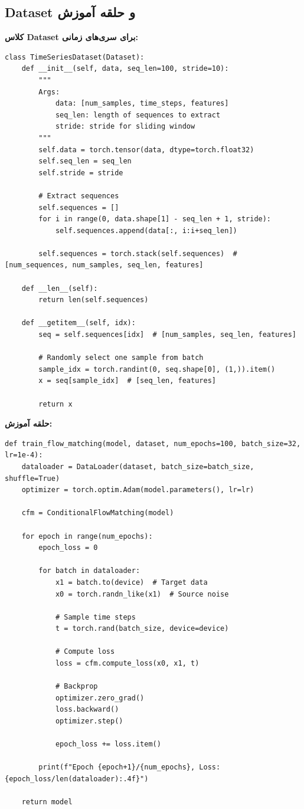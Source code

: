 \subsection{Dataset و حلقه آموزش}

\textbf{کلاس Dataset برای سری‌های زمانی:}
\begin{verbatim}
class TimeSeriesDataset(Dataset):
    def __init__(self, data, seq_len=100, stride=10):
        """
        Args:
            data: [num_samples, time_steps, features]
            seq_len: length of sequences to extract
            stride: stride for sliding window
        """
        self.data = torch.tensor(data, dtype=torch.float32)
        self.seq_len = seq_len
        self.stride = stride
        
        # Extract sequences
        self.sequences = []
        for i in range(0, data.shape[1] - seq_len + 1, stride):
            self.sequences.append(data[:, i:i+seq_len])
        
        self.sequences = torch.stack(self.sequences)  # [num_sequences, num_samples, seq_len, features]
    
    def __len__(self):
        return len(self.sequences)
    
    def __getitem__(self, idx):
        seq = self.sequences[idx]  # [num_samples, seq_len, features]
        
        # Randomly select one sample from batch
        sample_idx = torch.randint(0, seq.shape[0], (1,)).item()
        x = seq[sample_idx]  # [seq_len, features]
        
        return x
\end{verbatim}

\textbf{حلقه آموزش:}
\begin{verbatim}
def train_flow_matching(model, dataset, num_epochs=100, batch_size=32, lr=1e-4):
    dataloader = DataLoader(dataset, batch_size=batch_size, shuffle=True)
    optimizer = torch.optim.Adam(model.parameters(), lr=lr)
    
    cfm = ConditionalFlowMatching(model)
    
    for epoch in range(num_epochs):
        epoch_loss = 0
        
        for batch in dataloader:
            x1 = batch.to(device)  # Target data
            x0 = torch.randn_like(x1)  # Source noise
            
            # Sample time steps
            t = torch.rand(batch_size, device=device)
            
            # Compute loss
            loss = cfm.compute_loss(x0, x1, t)
            
            # Backprop
            optimizer.zero_grad()
            loss.backward()
            optimizer.step()
            
            epoch_loss += loss.item()
        
        print(f"Epoch {epoch+1}/{num_epochs}, Loss: {epoch_loss/len(dataloader):.4f}")
    
    return model
\end{verbatim}

